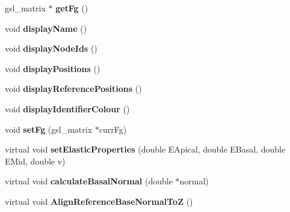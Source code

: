 \begin{DoxyCompactItemize}
\item 
\hypertarget{classShapeBase_a79889ef9cb7831a50e5391cb1cc19793}{}gsl\+\_\+matrix $\ast$ {\bfseries get\+Fg} ()\label{classShapeBase_a79889ef9cb7831a50e5391cb1cc19793}

\item 
\hypertarget{classShapeBase_ab8a7323c50767ecdc82d8d8ce411b264}{}void {\bfseries display\+Name} ()\label{classShapeBase_ab8a7323c50767ecdc82d8d8ce411b264}

\item 
\hypertarget{classShapeBase_a324f8fd5dd90c14b621b2f2ee3ec98db}{}void {\bfseries display\+Node\+Ids} ()\label{classShapeBase_a324f8fd5dd90c14b621b2f2ee3ec98db}

\item 
\hypertarget{classShapeBase_aca4d0f70caf459dc93f914ef7fc2a053}{}void {\bfseries display\+Positions} ()\label{classShapeBase_aca4d0f70caf459dc93f914ef7fc2a053}

\item 
\hypertarget{classShapeBase_af2d221cf63220dad3ecf139ffa164698}{}void {\bfseries display\+Reference\+Positions} ()\label{classShapeBase_af2d221cf63220dad3ecf139ffa164698}

\item 
\hypertarget{classShapeBase_aba6bb76d8adffaeb7ad36cce8a3f17ab}{}void {\bfseries display\+Identifier\+Colour} ()\label{classShapeBase_aba6bb76d8adffaeb7ad36cce8a3f17ab}

\item 
\hypertarget{classShapeBase_ad39c3f3a555a89e106c4afaaf81c72f6}{}void {\bfseries set\+Fg} (gsl\+\_\+matrix $\ast$curr\+Fg)\label{classShapeBase_ad39c3f3a555a89e106c4afaaf81c72f6}

\item 
\hypertarget{classShapeBase_a948e9da80e40851c9813f8251d1979ec}{}virtual void {\bfseries set\+Elastic\+Properties} (double E\+Apical, double E\+Basal, double E\+Mid, double v)\label{classShapeBase_a948e9da80e40851c9813f8251d1979ec}

\item 
\hypertarget{classShapeBase_ae7c003e9b98e31d04275ffb45709c9fa}{}virtual void {\bfseries calculate\+Basal\+Normal} (double $\ast$normal)\label{classShapeBase_ae7c003e9b98e31d04275ffb45709c9fa}

\item 
\hypertarget{classShapeBase_a362a15361e6fd25d65ed05f0cc31737a}{}virtual void {\bfseries Align\+Reference\+Base\+Normal\+To\+Z} ()\label{classShapeBase_a362a15361e6fd25d65ed05f0cc31737a}


\end{DoxyCompactItemize}
